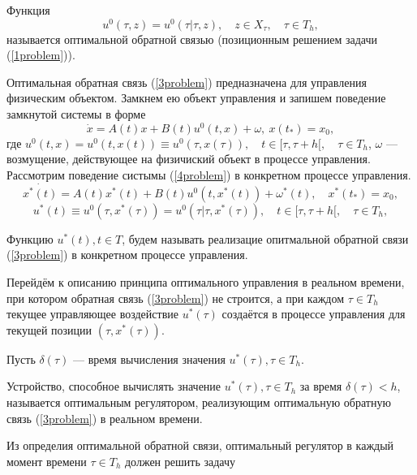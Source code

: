 Функция
\begin{equation} \label{3problem}
    u^0(\tau,z) = u^0(\tau|\tau,z),\quad z\in X_\tau,\quad \tau \in T_h,
    \end{equation}
называется оптимальной обратной связью (позиционным решением задачи (\ref{1problem})).

Оптимальная обратная связь (\ref{3problem}) предназначена для управления физическим объектом. Замкнем ею объект управления и запишем поведение замкнутой системы в форме
\begin{equation} \label{4problem}
\dot{x}=A(t)x+B(t)u^0(t,x) + \omega,\ x(t_*) = x_0,
 \end{equation}
где $u^0(t,x) = u^0(t,x(t)) \equiv u^0(\tau,x(\tau)),\quad t\in [\tau,\tau + h[,\quad \tau\in T_h$, $\omega$ — возмущение, действующее на физичиский объект в процессе управления.
\\
Рассмотрим поведение систымы (\ref{4problem}) в конкретном процессе управления.
$$\dot{x^*(t)}=A(t)x^*(t)+B(t)u^0(t,x^*(t)) + \omega^*(t),\quad x^*(t_*) = x_0,$$
$$u^*(t)\equiv u^0(\tau,x^*(\tau)) = u^0(\tau|\tau,x^*(\tau)),\quad t\in[\tau,\tau + h[,\quad  \tau \in T_h,$$

Функцию $u^*(t), t\in T$, будем называть реализацие опитмальной обратной связи (\ref{3problem}) в конкретном процессе управления. 


Перейдём к описанию принципа оптимального управления в реальном времени, при котором обратная связь  (\ref{3problem}) не строится, а при каждом $\tau \in T_h$ текущее управляющее воздействие $u^*(\tau)$ создаётся в процессе управления для текущей позиции $(\tau,x^*(\tau))$.

Пусть  $\delta(\tau)$ — время вычисления значения $u^*(\tau), \tau \in T_h$.
\begin{definition}
Устройство, способное вычислять значение $u^*(\tau), \tau \in T_h$ за время $\delta(\tau) < h$, называется оптимальным регулятором, реализующим оптимальную обратную связь (\ref{3problem}) в реальном времени.
\end{definition}

Из определия оптимальной обратной связи, оптимальный регулятор в каждый момент времени $\tau \in T_h$ должен решить задачу

